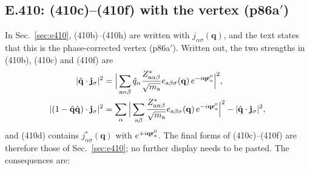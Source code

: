 \documentclass[11pt]{article}
\begin{document}
\subsection{E.410: (410c)--(410f) with the vertex (p86a$'$)}\label{sec:int-e410}
In Sec.~\ref{sec:e410}, (410b)--(410h) are written with $j_{\alpha\sigma}(\mathbf q)$, and the text states
that this is the phase-corrected vertex (p86a$'$). Written out, the two strengths in (410b), (410c) and
(410f) are
\begin{equation*}
\begin{aligned}
|\hat{\mathbf q}\cdot\mathbf j_\sigma|^2&=\Big|\sum_{{\rm a}\alpha\beta}\hat q_\alpha
\frac{Z^*_{{\rm a}\alpha\beta}}{\sqrt{m_{\rm a}}}e_{{\rm a}\beta\sigma}(\mathbf q)\,e^{-i\mathbf q\mathbf r^0_{\rm a}}\Big|^2,\\
|(1-\hat{\mathbf q}\hat{\mathbf q})\cdot\mathbf j_\sigma|^2&=\sum_\alpha\Big|\sum_{{\rm a}\beta}
\frac{Z^*_{{\rm a}\alpha\beta}}{\sqrt{m_{\rm a}}}e_{{\rm a}\beta\sigma}(\mathbf q)\,e^{-i\mathbf q\mathbf r^0_{\rm a}}\Big|^2
-|\hat{\mathbf q}\cdot\mathbf j_\sigma|^2,
\end{aligned}
\end{equation*}
and (410d) contains $j^*_{\alpha\sigma}(\mathbf q)$ with $e^{+i\mathbf q\mathbf r^0_{\rm a}}$. The final forms of
(410c)--(410f) are therefore those of Sec.~\ref{sec:e410}; no further display needs to be pasted. The
consequences are:
\end{document}
